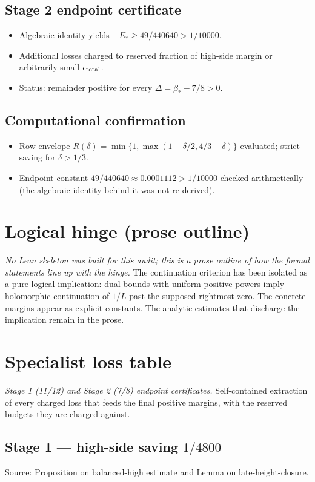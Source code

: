 \documentclass[11pt]{article}
\begin{document}
\subsection*{Stage 2 endpoint certificate}
\begin{itemize}[leftmargin=1.4em,itemsep=0.15em]
\item Algebraic identity yields $-E_*\ge 49/440640>1/10000$.
\item Additional losses charged to reserved fraction of high-side margin or arbitrarily small $\epsilon_{\rm total}$.
\item Status: remainder positive for every $\Delta=\beta_*-7/8>0$.
\end{itemize}
\subsection*{Computational confirmation}
\begin{itemize}[leftmargin=1.4em,itemsep=0.15em]
\item Row envelope $R(\delta)=\min\{1,\max(1-\delta/2,4/3-\delta)\}$ evaluated; strict saving for $\delta>1/3$.
\item Endpoint constant $49/440640\approx0.0001112>1/10000$ checked arithmetically (the algebraic identity behind it was not re-derived).
\end{itemize}

\section{Logical hinge (prose outline)}
\emph{No Lean skeleton was built for this audit; this is a prose outline of how the formal statements line up with the hinge.} The continuation criterion has been isolated as a pure logical implication: dual bounds with uniform positive powers imply holomorphic continuation of $1/L$ past the supposed rightmost zero. The concrete margins appear as explicit constants. The analytic estimates that discharge the implication remain in the prose.

\clearpage
\section{Specialist loss table}
\emph{Stage 1 (11/12) and Stage 2 (7/8) endpoint certificates.} Self-contained extraction of every charged loss that feeds the final positive margins, with the reserved budgets they are charged against.

\subsection{Stage 1 --- high-side saving $1/4800$}
Source: Proposition on balanced-high estimate and Lemma on late-height-closure.
\end{document}
